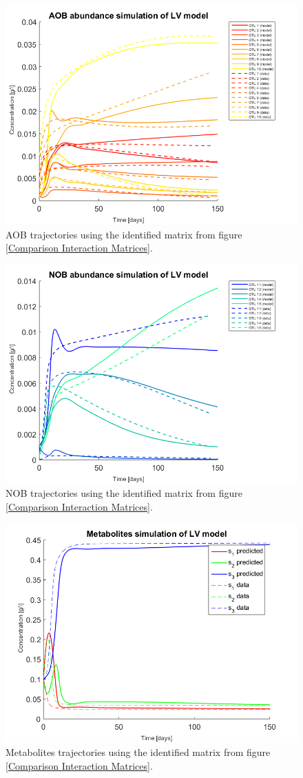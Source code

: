 \documentclass[3p,times]{elsarticle}
\begin{document}
\begin{figure}
	\centering
	\includegraphics[width=0.5 \textwidth]{Synthetic_data_no_noise//221119_no_noise_iter_5_AOB_Iter_5_LV}
	\caption{AOB trajectories using the identified matrix from figure \eqref{Comparison Interaction Matrices}.}
	\label{AOB LV simulation}
\end{figure}


\begin{figure}
	\centering
	\includegraphics[width=0.5 \textwidth]{Synthetic_data_no_noise//221119_no_noise_iter_5_NOB_Iter_5_LV}
	\caption{NOB trajectories using the identified matrix from figure \eqref{Comparison Interaction Matrices}.}
	\label{NOB LV simulation}
\end{figure}

\begin{figure}
	\centering
	\includegraphics[width=0.5 \textwidth]{Synthetic_data_no_noise//221119_no_noise_iter_5_metabolites_Iter_5_LV}
	\caption{Metabolites trajectories using the identified matrix from figure \eqref{Comparison Interaction Matrices}.}
	\label{Metabolites LV simulation}
\end{figure}
\end{document}

